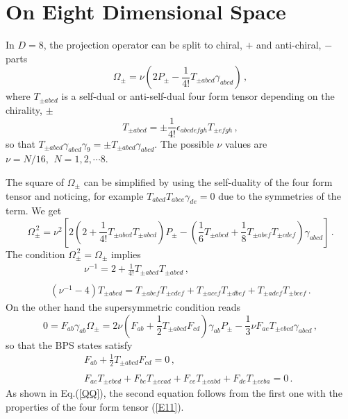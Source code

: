 \documentclass[a4paper,11pt]{article}
\newcommand{\const}{{\nu}}
\def\const{{\nu}}
\begin{document}
\section{On Eight Dimensional Space\label{EIGHT}}
In $D=8$, the  projection operator can be split to  chiral, $+$ and anti-chiral, $-$ parts
\begin{equation}
\Omega_{\pm}=\const(2P_{\pm}-\frac{1}{4!} T_{\pm abcd}\gamma_{abcd})\,,
\label{8p}
\end{equation}
where  $T_{\pm abcd}$ is a self-dual or anti-self-dual  four form tensor depending on the chirality, $\pm$
\begin{equation}
T_{\pm abcd}=\pm\frac{1}{4!}\epsilon_{abcdefgh}T_{\pm efgh}\,,
\end{equation}
so that $T_{\pm abcd}\gamma_{abcd}\gamma_{9}=\pm T_{\pm abcd}\gamma_{abcd}$.  The possible $\const$ values are $\const=N/16,~\,N=1,2,\cdots 8$.



The square of $\Omega_{\pm}$ can be simplified by using the self-duality of the  four form tensor and noticing, for example
$T_{abcd}T_{abce}\gamma_{de}=0$ due to the symmetries of the term.  We get
\begin{equation}
\Omega_{\pm}^{\,2}=\const^{2}\left[2(2+\frac{1}{4!}T_{\pm abcd}T_{\pm abcd})P_{\pm} -(\frac{1}{6}T_{\pm
abcd}+\frac{1}{8}T_{\pm abef}T_{\pm cdef})\gamma_{abcd}\right]\,.
\end{equation}
The condition $\Omega_{\pm}^{\,2}=\Omega_{\pm}$ implies
\begin{equation}
\begin{array}{l}
~~~~~~~~~~~~~~~\,\const^{-1}=2+\frac{1}{4!}T_{\pm abcd}T_{\pm abcd}\,,\\{}\\ (\const^{-1}-4)T_{\pm abcd} =T_{\pm abef}T_{\pm cdef}+T_{\pm
acef}T_{\pm dbef}+T_{\pm adef}T_{\pm bcef}\,.
\end{array}
\label{E11}
\end{equation}
On the other hand the supersymmetric condition reads
\begin{equation}
0=F_{ab}\gamma_{ab}\Omega_{\pm}=2\const (F_{ab}+\frac{1}{2}T_{\pm abcd}F_{cd})\gamma_{ab}P_{\pm}-\frac{1}{3}\const
F_{ae}T_{\pm ebcd}\gamma_{abcd}\,,
\end{equation}
so that the BPS states satisfy
\begin{eqnarray}
&&F_{ab}+\frac{1}{2}T_{\pm abcd}F_{cd}=0\,,\label{pre8BPS}\\ {}\nonumber\\
&&F_{a e}T_{\pm ebcd}+F_{be}T_{\pm ecad}+F_{ce}T_{\pm eabd}+F_{de}T_{\pm ecba}=0\,.
\end{eqnarray}
As shown in Eq.(\ref{QQ}),  the second equation follows from the first one  with the properties of the four form tensor (\ref{E11}).
\end{document}
